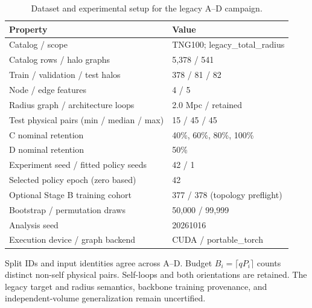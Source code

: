 \begin{table}[t]
\centering
\small
\caption{Dataset and experimental setup for the legacy A--D campaign.}
\label{tab:cosmic-1}
\setlength{\tabcolsep}{4pt}
\begin{tabular}{ll}
\toprule
Property & Value \\
\midrule
Catalog / scope & TNG100; legacy\_total\_radius \\
Catalog rows / halo graphs & 5,378 / 541 \\
Train / validation / test halos & 378 / 81 / 82 \\
Node / edge features & 4 / 5 \\
Radius graph / architecture loops & 2.0 Mpc / retained \\
Test physical pairs (min / median / max) & 15 / 45 / 45 \\
C nominal retention & 40\%, 60\%, 80\%, 100\% \\
D nominal retention & 50\% \\
Experiment seed / fitted policy seeds & 42 / 1 \\
Selected policy epoch (zero based) & 42 \\
Optional Stage B training cohort & 377 / 378 (topology preflight) \\
Bootstrap / permutation draws & 50,000 / 99,999 \\
Analysis seed & 20261016 \\
Execution device / graph backend & CUDA / portable\_torch \\
\bottomrule
\end{tabular}
\par\smallskip
\begin{minipage}{0.98\textwidth}
\footnotesize Split IDs and input identities agree across A--D. Budget $B_i=\lceil qP_i\rceil$ counts distinct non-self physical pairs. Self-loops and both orientations are retained. The legacy target and radius semantics, backbone training provenance, and independent-volume generalization remain uncertified.
\end{minipage}
\end{table}
